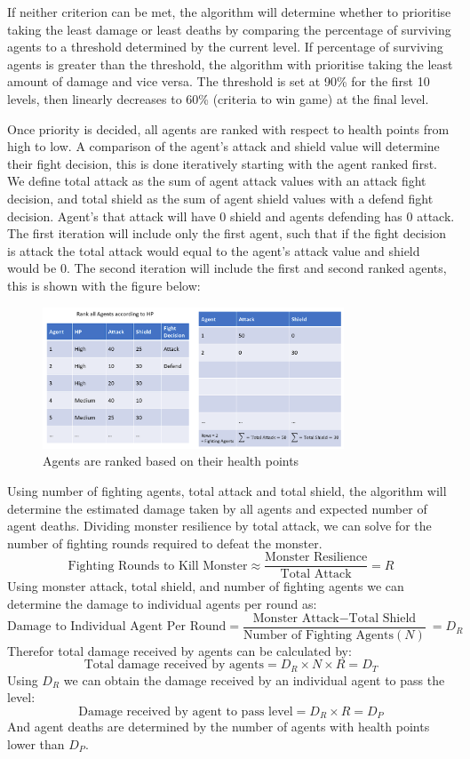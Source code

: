 If neither criterion can be met, the algorithm will determine whether to prioritise taking the least damage or least deaths by comparing the percentage of surviving agents to a threshold determined by the current level. If percentage of surviving agents is greater than the threshold, the algorithm with prioritise taking the least amount of damage and vice versa. The threshold is set at 90\% for the first 10 levels, then linearly decreases to 60\% (criteria to win game) at the final level.

Once priority is decided, all agents are ranked with respect to health points from high to low. A comparison of the agent's attack and shield value will determine their fight decision, this is done iteratively starting with the agent ranked first. We define total attack as the sum of agent attack values with an attack fight decision, and total shield as the sum of agent shield values with a defend fight decision. Agent's that attack will have 0 shield and agents defending has 0 attack. The first iteration will include only the first agent, such that if the fight decision is attack the total attack would equal to the agent's attack value and shield would be 0. The second iteration will include the first and second ranked agents, this is shown with the figure below:

\begin{figure}[htb]
    \centering
    \includegraphics[width=0.8\textwidth]{008_team_5_agent_design/images/Rank-all-Agents-by-hp.png}
    \caption{Agents are ranked based on their health points}
    \label{rankagents}
\end{figure}

Using number of fighting agents, total attack and total shield, the algorithm will determine the estimated damage taken by all agents and expected number of agent deaths. Dividing monster resilience by total attack, we can solve for the number of fighting rounds required to defeat the monster.
\[\text{Fighting Rounds to Kill Monster} \approx \frac{\text{Monster Resilience}}{\text{Total Attack}}=R\]
Using monster attack, total shield, and number of fighting agents we can determine the damage to individual agents per round as:
\[\text{Damage to Individual Agent Per Round} = \frac{\text{Monster Attack}\mathrm{-}\text{Total Shield}}{\text{Number of Fighting Agents} (N)}\ =D_R\]
Therefor total damage received by agents can be calculated by:
\[\text{Total damage received by agents} = D_R \times N \times R = D_T\]
Using $D_R$ we can obtain the damage received by an individual agent to pass the level:
\[\text{Damage received by agent to pass level} = D_R \times  R = D_P\]
And agent deaths are determined by the number of agents with health points lower than $D_P$.

